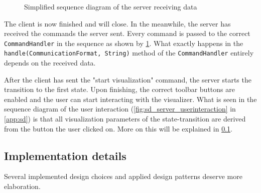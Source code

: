 \documentclass[a4paper]{article}
\begin{document}
	\begin{figure}[ht]
		\centering
		\caption{Simplified sequence diagram of the server receiving data}
		\label{fig:sd_server_receivecommand}
	\end{figure}
	The client is now finished and will close. In the meanwhile, the server has received the commands the server sent. Every command is passed to the correct \lstinline{CommandHandler} in the sequence as shown by \cref{fig:sd_server_receivecommand}. What exactly happens in the \lstinline{handle(CommunicationFormat, String)} method of the \lstinline{CommandHandler} entirely depends on the received data.
	
	After the client has sent the "start visualization" command, the server starts the transition to the first state. Upon finishing, the correct toolbar buttons are enabled and the user can start interacting with the visualizer. What is seen in the sequence diagram of the user interaction (\cref{fig:sd_server_userinteraction} in \cref{app:sd}) is that all visualization parameters of the state-transition are derived from the button the user clicked on. More on this will be explained in \cref{subsec:implementationdetails}.
	
	
	\subsection{Implementation details}\label{subsec:implementationdetails}
	Several implemented design choices and applied design patterns deserve more elaboration.
	
\end{document}

